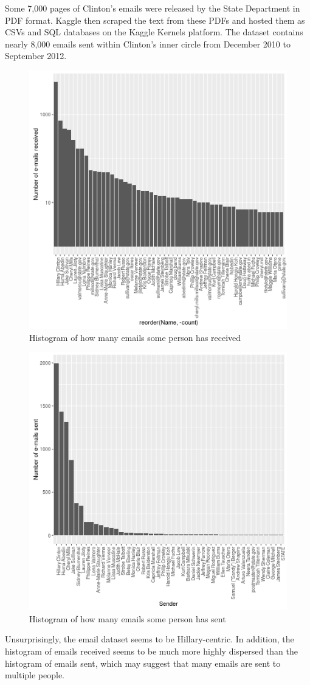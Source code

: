 Some 7,000 pages of Clinton's emails were released by the State Department in PDF format.
Kaggle then scraped the text from these PDFs and hosted them as CSVs and SQL databases on the Kaggle Kernels platform.
The dataset contains nearly 8,000 emails sent within Clinton's inner circle from December 2010 to September 2012.

\begin{figure}[h]
  \centering
  \includegraphics[scale=0.8]{palmer/graphics/num_recvd_histogram}
  \caption{Histogram of how many emails some person has received}
  \label{fig:n_recv_hist}
\end{figure}

\begin{figure}[h]
  \centering
  \includegraphics[scale=0.8]{palmer/graphics/num_sent_histogram}
  \caption{Histogram of how many emails some person has sent}
  \label{fig:n_sent_hist}
\end{figure}

Unsurprisingly, the email dataset seems to be Hillary-centric.
In addition, the histogram of emails received seems to be much more highly dispersed than the histogram of emails sent, which may suggest that many emails are sent to multiple people.


